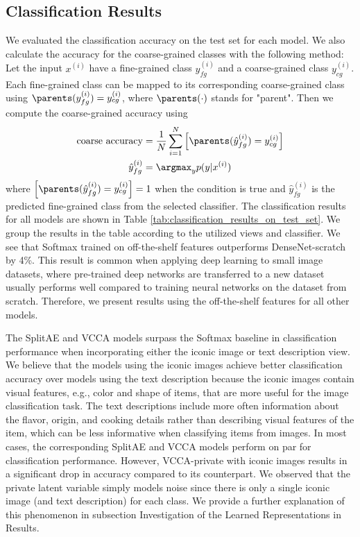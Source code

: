 \subsection{Classification Results}
\label{sec:classification_results}

We evaluated the classification accuracy on the test set for each model. We also calculate the accuracy for the coarse-grained classes with the following method: Let the input $x^{(i)}$ have a fine-grained class $y_{fg}^{(i)}$ and a coarse-grained class $y_{cg}^{(i)}$. Each fine-grained class can be mapped to its corresponding coarse-grained class using $\parents(y_{fg}^{(i)}) = y_{cg}^{(i)}$, where $\parents(\cdot)$ stands for "parent". Then we compute the coarse-grained accuracy using  
\begin{align}\label{eq:coarse_accuracy}
    \begin{split}
        \text{coarse accuracy} & = \frac{1}{N} \sum_{i=1}^{N} \left[ \parents(\hat{y}_{fg}^{(i)}) = y_{cg}^{(i)} \right] \\
        \hat{y}_{fg}^{(i)} & = \argmax_{y} p(y | x^{(i)})
    \end{split}
\end{align}
where $\left[ \parents(\hat{y}_{fg}^{(i)}) = y_{cg}^{(i)} \right] = 1$ when the condition is true and $\hat{y}_{fg}^{(i)}$ is the predicted fine-grained class from the selected classifier. The classification results for all models are shown in Table \ref{tab:classification_results_on_test_set}. We group the results in the table according to the utilized views and classifier. We see that Softmax trained on off-the-shelf features outperforms DenseNet-scratch by 4\%. This result is common when applying deep learning to small image datasets, where pre-trained deep networks are transferred to a new dataset usually performs well compared to training neural networks on the dataset from scratch. Therefore, we present results using the off-the-shelf features for all other models. 



The SplitAE and VCCA models surpass the Softmax baseline in classification performance when incorporating either the iconic image or text description view. 
We believe that the models using the iconic images achieve better classification accuracy over models using the text description because the iconic images contain visual features, e.g., color and shape of items, that are more useful for the image classification task. The text descriptions include more often information about the flavor, origin, and cooking details rather than describing visual features of the item, which can be less informative when classifying items from images. In most cases, the corresponding SplitAE and VCCA models perform on par for classification performance. However, VCCA-private with iconic images results in a significant drop in accuracy compared to its counterpart. We observed that the private latent variable simply models noise since there is only a single iconic image (and text description) for each class. We provide a further explanation of this phenomenon in subsection Investigation of the Learned Representations in Results.

